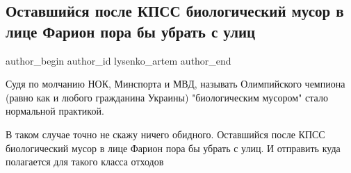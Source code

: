  
 
 
 
 
 
\subsection{Оставшийся после КПСС биологический мусор в лице Фарион пора бы убрать с улиц}
\label{sec:10_08_2021.fb.lysenko_artem.1.farion_biomusor_maguchih}
 
\ifcmt
 author_begin
   author_id lysenko_artem
 author_end
\fi

Судя по молчанию НОК, Минспорта и МВД, называть Олимпийского чемпиона (равно
как и любого гражданина Украины) "биологическим мусором" стало нормальной
практикой.

В таком случае точно не скажу ничего обидного.  Оставшийся после КПСС
биологический мусор в лице Фарион пора бы убрать с улиц. И отправить куда
полагается для такого класса отходов

